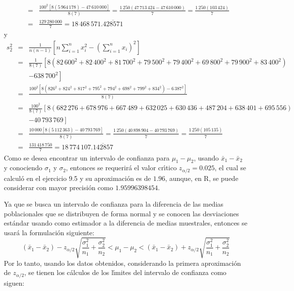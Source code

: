 \begin{solucion}
\begin{eqnarray*}
  & = & 
  \frac{100^2\left[ 8(5\,964\,178) - 47\,610\,000 \right]}{8(7)} = \frac{1\,250(47\,713\,424 - 47\,610\,000)}{7} = \frac{1\,250(103\,424)}{7} \\
  & = & \frac{129\,280\,000}{7} = 18\,468\,571.\overline{428571}
 \end{eqnarray*}
 y
 \begin{eqnarray*}
  s_2^2 & = & \frac{1}{n(n-1)} \left[ n\sum_{i=1}^n x_i^2 - \left( \sum_{i=1}^n x_i \right)^2 \right] \\
  & = & \frac{1}{8(7)}\left[ 8\left( 82\,600^2 + 82\,400^2 + 81\,700^2 + 79\,500^2 + 79\,400^2 + 69\,800^2 + 79\,900^2 + 83\,400^2 \right) \right. \\
  & & \left. - 638\,700^2 \right] \\
  & = & \frac{100^2 \left[ 8\left( 826^2 + 824^2 + 817^2 + 795^2 + 794^2 + 698^2 + 799^2 + 834^2 \right) - 6\,387^2 \right]}{8(7)} \\
  & = & \frac{100^2}{8(7)} \left[ 8( 682\,276 + 678\,976 + 667\,489 + 632\,025 + 630\,436 + 487\,204 + 638\,401 + 695\,556) \right. \\
  & & \left.  - 40\,793\,769 \right] \\
  & = & \frac{10\,000\left[ 8(5\,112\,363) - 40\,793\,769 \right]}{8(7)} = \frac{1\,250(40\,898\,904 - 40\,793\,769)}{7} = \frac{1\,250(105\,135)}{7} \\
  & = & \frac{131\,418\,750}{7} = 18\,774\,107.\overline{142857}
 \end{eqnarray*}
 Como se desea encontrar un intervalo de confianza para $\mu_1 - \mu_2$, usando $\bar{x}_1 - \bar{x}_2$ y conociendo $\sigma_1$ y $\sigma_2$, entonces se requerir\'a el valor cr\'{\i}tico $z_{\alpha/2} = 0.025$, el cual se calcul\'o en el ejercicio 9.5 y su aproximaci\'on es de $1.96$, aunque, en R, se puede considerar con mayor precisi\'on como $1.95996398454$.
 \par 
 Ya que se busca un intervalo de confianza para la diferencia de las medias poblacionales que se distribuyen de forma normal y se conocen las desviaciones est\'andar usando como estimador a la diferencia de medias muestrales, entonces se usar\'a la formulaci\'on siguiente:
 \begin{equation*}
  \left( \bar{x}_1 - \bar{x}_2 \right) - z_{\alpha/2}\sqrt{\frac{\sigma_1^2}{n_1} + \frac{\sigma_2^2}{n_2}} < \mu_1 - \mu_2 < \left( \bar{x}_1 - \bar{x}_2 \right) + z_{\alpha/2}\sqrt{\frac{\sigma_1^2}{n_1} + \frac{\sigma_2^2}{n_2}}
 \end{equation*}
 Por lo tanto, usando los datos obtenidos, considerando la primera aproximaci\'on de $z_{\alpha/2}$, se tienen los c\'alculos de los l\'{\i}mites del intervalo de confianza como siguen:

\end{solucion}
